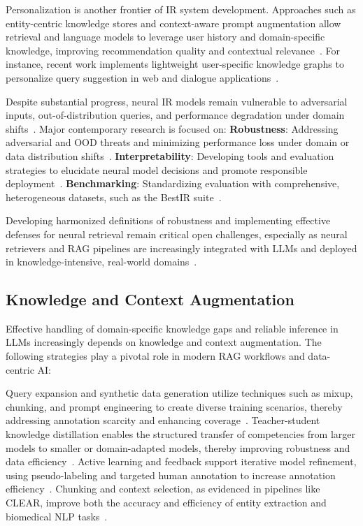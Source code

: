 \documentclass[sigconf]{acmart}
\begin{document}
Personalization is another frontier of IR system development. Approaches such as entity-centric knowledge stores and context-aware prompt augmentation allow retrieval and language models to leverage user history and domain-specific knowledge, improving recommendation quality and contextual relevance~\cite{ref8,ref10,ref14,ref15,ref17,ref26,ref28,ref36,ref37,ref38,ref43,ref52,ref54}. For instance, recent work implements lightweight user-specific knowledge graphs to personalize query suggestion in web and dialogue applications~\cite{ref36,ref37}.

Despite substantial progress, neural IR models remain vulnerable to adversarial inputs, out-of-distribution queries, and performance degradation under domain shifts~\cite{ref7,ref20,ref26,ref46,ref54,ref63,ref64}. Major contemporary research is focused on:
\textbf{Robustness}: Addressing adversarial and OOD threats and minimizing performance loss under domain or data distribution shifts~\cite{ref26,ref46}.
\textbf{Interpretability}: Developing tools and evaluation strategies to elucidate neural model decisions and promote responsible deployment~\cite{ref26,ref63}.
\textbf{Benchmarking}: Standardizing evaluation with comprehensive, heterogeneous datasets, such as the BestIR suite~\cite{ref7,ref26,ref63,ref64}.

Developing harmonized definitions of robustness and implementing effective defenses for neural retrieval remain critical open challenges, especially as neural retrievers and RAG pipelines are increasingly integrated with LLMs and deployed in knowledge-intensive, real-world domains~\cite{ref7,ref26,ref63,ref64}.

\subsection{Knowledge and Context Augmentation}

Effective handling of domain-specific knowledge gaps and reliable inference in LLMs increasingly depends on knowledge and context augmentation. The following strategies play a pivotal role in modern RAG workflows and data-centric AI:

Query expansion and synthetic data generation utilize techniques such as mixup, chunking, and prompt engineering to create diverse training scenarios, thereby addressing annotation scarcity and enhancing coverage~\cite{ref5, ref10, ref12, ref15, ref16, ref22, ref24, ref31, ref32, ref36, ref37, ref43, ref48, ref49, ref52, ref54, ref55, ref61, ref62}. Teacher-student knowledge distillation enables the structured transfer of competencies from larger models to smaller or domain-adapted models, thereby improving robustness and data efficiency~\cite{ref32, ref33, ref55}. Active learning and feedback support iterative model refinement, using pseudo-labeling and targeted human annotation to increase annotation efficiency~\cite{ref31, ref32, ref55}. Chunking and context selection, as evidenced in pipelines like CLEAR, improve both the accuracy and efficiency of entity extraction and biomedical NLP tasks~\cite{ref5, ref36, ref43, ref54, ref61}. 
\end{document}
